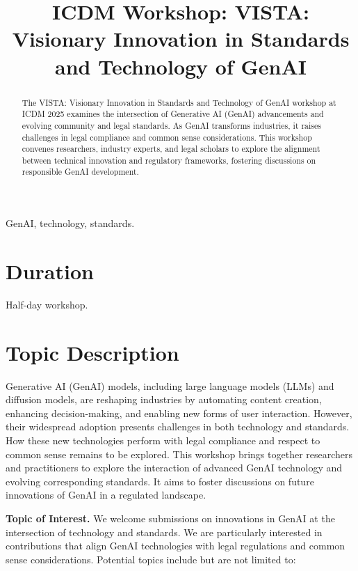 \documentclass[conference]{IEEEtran}
\begin{document}
\title{ICDM Workshop: VISTA: Visionary Innovation in Standards and Technology of GenAI
}

\maketitle

\begin{abstract}
The VISTA: Visionary Innovation in Standards and Technology of GenAI workshop at ICDM 2025 examines the intersection of Generative AI (GenAI) advancements and evolving community and legal standards. As GenAI transforms industries, it raises challenges in legal compliance and common sense considerations. This workshop convenes researchers, industry experts, and legal scholars to explore the alignment between technical innovation and regulatory frameworks, fostering discussions on responsible GenAI development.
\end{abstract}

\begin{IEEEkeywords}
GenAI, technology, standards.
\end{IEEEkeywords}

\section{Duration}
Half-day workshop.

\section{Topic Description}
Generative AI (GenAI) models, including large language models (LLMs) and diffusion models, are reshaping industries by automating content creation, enhancing decision-making, and enabling new forms of user interaction. However, their widespread adoption presents challenges in both technology and standards. How these new technologies perform with legal compliance and respect to common sense remains to be explored. This workshop brings together researchers and practitioners to explore the interaction of advanced GenAI technology and evolving corresponding standards. It aims to foster discussions on future innovations of GenAI in a regulated landscape.

\noindent\textbf{Topic of Interest.} We welcome submissions on innovations in GenAI at the intersection of technology and standards. We are particularly interested in contributions that align GenAI technologies with legal regulations and common sense considerations.
Potential topics include but are not limited to:
\end{document}
